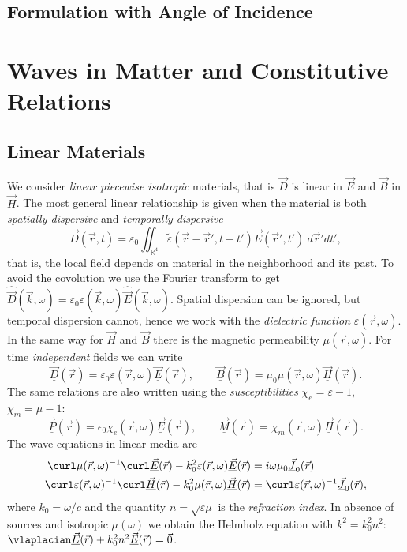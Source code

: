 \documentclass[margin=tiny]{hsrzf}
\newcommand{\cvec}[1]{\underline{\vec{#1}}}
\begin{document}
\subsection{Formulation with Angle of Incidence}

\section{Waves in Matter and Constitutive Relations}

\subsection{Linear Materials}

We consider \emph{linear piecewise isotropic} materials, that is $\vec{D}$ is
linear in $\vec{E}$ and $\vec{B}$ in $\vec{H}$. The most general linear
relationship is given when the material is both \emph{spatially dispersive}
and \emph{temporally dispersive}
\[
  \vec{D}(\vec{r}, t) = \varepsilon_0 \iint_{\mathbb{R}^4} \tilde{\varepsilon}(\vec{r} -
  \vec{r}', t - t') \vec{E}(\vec{r}', t') ~d\vec{r}' dt',
\]
that is, the local field depends on material in the neighborhood and its past.
To avoid the covolution we use the Fourier transform to get
$\hat{\vec{D}}(\vec{k}, \omega) = \varepsilon_0 \varepsilon(\vec{k}, \omega)
\hat{\vec{E}}(\vec{k}, \omega)$. Spatial dispersion can be ignored, but
temporal dispersion cannot, hence we work with the \emph{dielectric function}
$\varepsilon(\vec{r}, \omega)$. In the same way for $\vec{H}$ and $\vec{B}$
there is the magnetic permeability $\mu(\vec{r}, \omega)$. For time
\emph{independent} fields we can write
\[
  \cvec{D}(\vec{r}) = \varepsilon_0\varepsilon(\vec{r}, \omega)
    \cvec{E}(\vec{r}), \qquad
  \cvec{B}(\vec{r}) = \mu_0\mu(\vec{r}, \omega) \cvec{H}(\vec{r}).
\]
The same relations are also written using the \emph{susceptibilities}
$\chi_e = \varepsilon -1$, $\chi_m = \mu - 1$:
\[
  \cvec{P}(\vec{r}) = \epsilon_0\chi_e(\vec{r}, \omega)\cvec{E}(\vec{r}),
  \qquad
  \cvec{M}(\vec{r}) = \chi_m(\vec{r}, \omega) \cvec{H}(\vec{r}).
\]
The wave equations in linear media are
\begin{align*}
  \curl \mu(\vec{r}, \omega)^{-1} \curl \cvec{E}(\vec{r})
    - k_0^2 \varepsilon(\vec{r}, \omega) \cvec{E}(\vec{r})
    &= i\omega \mu_0 \cvec{J}_0(\vec{r}) \\
  \curl \varepsilon(\vec{r}, \omega)^{-1} \curl \cvec{H}(\vec{r})
    - k_0^2 \mu(\vec{r}, \omega) \cvec{H}(\vec{r})
    &= \curl \varepsilon(\vec{r}, \omega)^{-1} \cvec{J}_0(\vec{r}),
\end{align*}
where $k_0 = \omega / c$ and the quantity $n = \sqrt{\varepsilon \mu}$ is the
\emph{refraction index}. In absence of sources and isotropic $\mu(\omega)$ we
obtain the Helmholz equation with $k^2 = k_0^2n^2$:
$\vlaplacian\cvec{E}(\vec{r}) + k_0^2n^2\cvec{E}(\vec{r}) = \vec{0}$.
\end{document}
